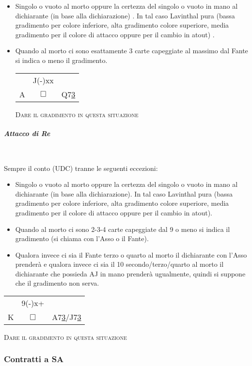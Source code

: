 \documentclass[a4paper,italian]{article}
\newcommand{\cards}[1]{\textsf{#1}}
\newcommand\onesuitenw[3]%
{%
    \begin{center}%
        \begin{tabular}{>{\hfill}p{3cm}cp{3cm}}%
                & \cards{#2} \\%
            \cards{#1}& $\Box$    & \cards{#3}%
        \end{tabular}%
    \end{center}%
}
\begin{document}
\begin{itemize}
    \item Singolo o vuoto al morto oppure la certezza del singolo o vuoto in mano al dichiarante
        (in base alla dichiarazione) . In tal caso Lavinthal pura (bassa gradimento per colore
        inferiore, alta gradimento colore superiore, media gradimento per il colore di attacco
        oppure per il cambio in atout) .
    \item Quando al morto ci sono esattamente 3 carte capeggiate al massimo dal Fante si indica
        o meno il gradimento.
        \onesuitenw{A}{J(-)xx}{Q7\underline{3}}
        \begin{center}
            \textsc{Dare il gradimento in questa situazione}
        \end{center}
\end{itemize}

\paragraph{\textit{Attacco di Re}}\mbox{}\\
\vspace{-.4cm}

Sempre il conto (UDC) tranne le seguenti eccezioni:
\begin{itemize}
    \item Singolo o vuoto al morto oppure la certezza del singolo o vuoto in mano al dichiarante
        (in base alla dichiarazione). In tal caso Lavinthal pura (bassa gradimento per colore
        inferiore, alta gradimento colore superiore, media gradimento per il colore di attacco
        oppure per il cambio in atout).
    \item Quando al morto ci sono 2-3-4 carte capeggiate dal 9 o meno si indica il gradimento (si
        chiama con l’Asso o il Fante).
    \item Qualora invece ci sia il Fante terzo o quarto al morto il
        dichiarante con l’Asso prenderà e qualora invece ci sia il 10 secondo/terzo/quarto al
        morto il dichiarante che possieda AJ in mano prenderà ugualmente, quindi si suppone
        che il gradimento non serva.
\end{itemize}
\onesuitenw{K}{9(-)x+}{A7\underline{3}/J7\underline{3}}
\begin{center}
    \textsc{Dare il gradimento in questa situazione}
\end{center}

\subsubsection{Contratti a SA}
\end{document}
